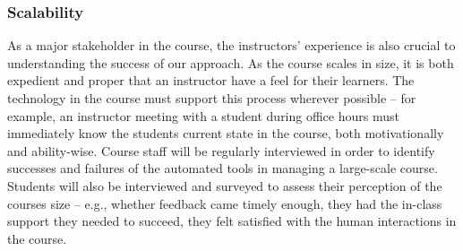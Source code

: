 \subsubsection{Scalability}
As a major stakeholder in the course, the instructors’ experience is also crucial to understanding the success of our approach.
As the course scales in size, it is both expedient and proper that an instructor have a feel for their learners.
The technology in the course must support this process wherever possible – for example, an instructor meeting with a student during office hours must immediately know the students current state in the course, both motivationally and ability-wise.
Course staff will be regularly interviewed in order to identify successes and failures of the automated tools in managing a large-scale course.
Students will also be interviewed and surveyed to assess their perception of the courses size – e.g., whether feedback came timely enough, they had the in-class support they needed to succeed, they felt satisfied with the human interactions in the course.

